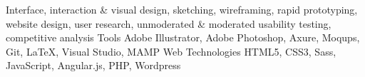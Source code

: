   \begin{cvskills}
                 {Interface, interaction \& visual design, sketching, wireframing, rapid prototyping, website design, user research, unmoderated \& moderated usability testing, competitive analysis}
	\cvskill
		{Tools}
		{Adobe Illustrator, Adobe Photoshop, Axure, Moqups, Git, LaTeX, Visual Studio, MAMP}
  	\cvskill
		{Web Technologies}
		{HTML5, CSS3, Sass, JavaScript, Angular.js, PHP, Wordpress}
  \end{cvskills}